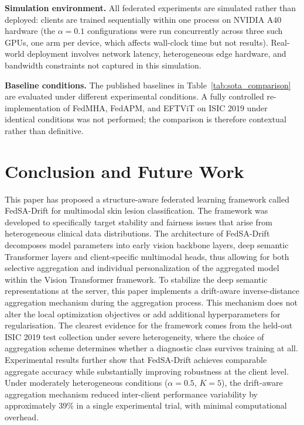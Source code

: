 \documentclass{ieeeaccess}
\newcommand{\sadrift}{FedSA-Drift}
\begin{document}
\textbf{Simulation environment.} All federated experiments are simulated rather than deployed: clients are trained sequentially within one process on NVIDIA A40 hardware (the $\alpha{=}0.1$ configurations were run concurrently across three such GPUs, one arm per device, which affects wall-clock time but not results). Real-world deployment involves network latency, heterogeneous edge hardware, and bandwidth constraints not captured in this simulation.

\textbf{Baseline conditions.} The published baselines in Table~\ref{tab:sota_comparison} are evaluated under different experimental conditions. A fully controlled re-implementation of FedMHA, FedAPM, and EFTViT on ISIC 2019 under identical conditions was not performed; the comparison is therefore contextual rather than definitive.

\section{Conclusion and Future Work}

This paper has proposed a structure-aware federated learning framework called \sadrift{} for multimodal skin lesion classification. The framework was developed to specifically target stability and fairness issues that arise from heterogeneous clinical data distributions. The architecture of \sadrift{} decomposes model parameters into early vision backbone layers, deep semantic Transformer layers and client-specific multimodal heads, thus allowing for both selective aggregation and individual personalization of the aggregated model within the Vision Transformer framework. To stabilize the deep semantic representations at the server, this paper implements a drift-aware inverse-distance aggregation mechanism during the aggregation process. This mechanism does not alter the local optimization objectives or add additional hyperparameters for regularisation. The clearest evidence for the framework comes from the held-out ISIC 2019 test collection under severe heterogeneity, where the choice of aggregation scheme determines whether a diagnostic class survives training at all. Experimental results further show that \sadrift{} achieves comparable aggregate accuracy while substantially improving robustness at the client level. Under moderately heterogeneous conditions ($\alpha = 0.5$, $K = 5$), the drift-aware aggregation mechanism reduced inter-client performance variability by approximately 39\% in a single experimental trial, with minimal computational overhead.
\end{document}
